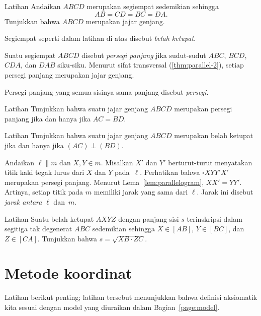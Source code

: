 \begin{thm}{Latihan}\label{ex:romb}
Andaikan $ABCD$ merupakan segiempat sedemikian sehingga
\[AB=CD=BC=DA.\]
Tunjukkan bahwa $ABCD$ merupakan jajar genjang.
\end{thm}

Segiempat seperti dalam latihan di atas disebut \emph{belah ketupat}.

Suatu segiempat $ABCD$ disebut \emph{persegi panjang} jika sudut-sudut $ABC$, $BCD$, $CDA$, dan $DAB$ siku-siku.
Menurut sifat transversal (\ref{thm:parallel-2}),
setiap persegi panjang merupakan jajar genjang.

Persegi panjang yang semua sisinya sama panjang disebut \emph{persegi}.

\begin{thm}{Latihan}\label{ex:rectangle}
Tunjukkan bahwa suatu jajar genjang $ABCD$ merupakan persegi panjang
jika dan hanya jika $AC=BD$.
\end{thm}

\begin{thm}{Latihan}\label{ex:romb2}
Tunjukkan bahwa suatu jajar genjang $ABCD$ merupakan belah ketupat
jika dan hanya jika $(AC)\perp (BD)$.
\end{thm}

Andaikan $\ell\parallel m$ dan $X,Y\in m$.
Misalkan $X'$ dan $Y'$ berturut-turut menyatakan titik kaki tegak lurus dari $X$ dan $Y$ pada~$\ell$.
Perhatikan bahwa $\square XYY'X'$ merupakan persegi panjang.
Menurut Lema~\ref{lem:parallelogram}, $XX'=YY'$.
Artinya, setiap titik pada $m$ memiliki jarak yang sama dari $\ell$.
Jarak ini disebut \emph{jarak antara} $\ell$ dan~$m$.

\begin{thm}{Latihan}\label{ex:inscribed-rhombus}
Suatu belah ketupat $AXYZ$ dengan panjang sisi $s$ terinskripsi dalam segitiga tak degenerat $ABC$ sedemikian sehingga $X\in [AB]$, $Y\in [BC]$, dan $Z\in[CA]$.
Tunjukkan bahwa $s=\sqrt{XB\cdot ZC}$.
\end{thm}

\section{Metode koordinat}

Latihan berikut penting;
latihan tersebut menunjukkan bahwa definisi aksiomatik kita sesuai dengan model yang diuraikan dalam Bagian~\ref{page:model}.


